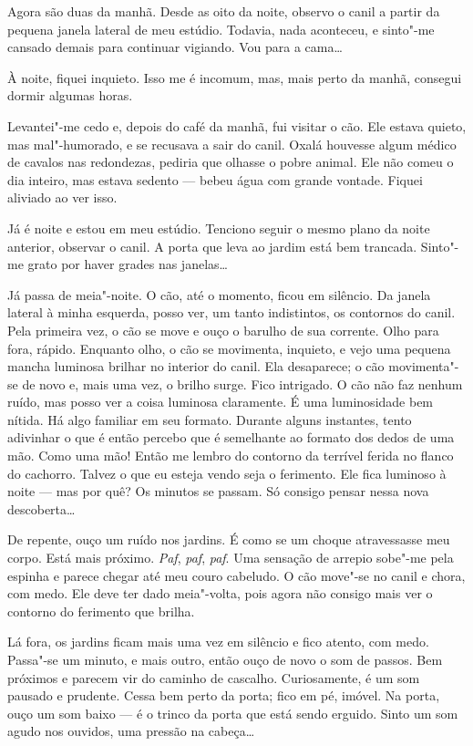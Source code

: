 Agora são duas da manhã. Desde as oito da noite, observo o canil a partir da pequena janela lateral de meu estúdio.
Todavia, nada aconteceu, e sinto"-me cansado demais para continuar vigiando. Vou para a cama\ldots{}

À noite, fiquei inquieto. Isso me é incomum, mas, mais perto da manhã, consegui dormir algumas horas.

Levantei"-me cedo e, depois do café da manhã, fui visitar o cão. Ele estava quieto, mas mal"-humorado, e se recusava a
sair do canil. Oxalá houvesse algum médico de cavalos nas redondezas, pediria que olhasse o pobre animal. Ele não comeu
o dia inteiro, mas estava sedento --- bebeu água com grande vontade. Fiquei aliviado ao ver isso.

Já é noite e estou em meu estúdio. Tenciono seguir o mesmo plano da noite anterior, observar o canil. A porta que leva
ao jardim está bem trancada. Sinto"-me grato por haver grades nas janelas\ldots{}

Já passa de meia"-noite. O cão, até o momento, ficou em silêncio. Da janela lateral à minha esquerda, posso
ver, um tanto indistintos, os contornos do canil. Pela primeira vez, o cão se move e ouço o barulho de sua corrente.
Olho para fora, rápido. Enquanto olho, o cão se movimenta, inquieto, e vejo uma pequena mancha luminosa brilhar no
interior do canil. Ela desaparece; o cão movimenta"-se de novo e, mais uma vez, o brilho surge. Fico intrigado. O cão
não faz nenhum ruído, mas posso ver a coisa luminosa claramente. É uma luminosidade bem nítida. Há algo familiar em seu
formato. Durante alguns instantes, tento adivinhar o que é então percebo que é semelhante ao formato dos dedos de
uma mão. Como uma mão! Então me lembro do contorno da terrível ferida no flanco do cachorro. Talvez o que eu esteja
vendo seja o ferimento. Ele fica luminoso à noite --- mas por quê? Os minutos se passam. Só consigo pensar nessa nova
descoberta\ldots{}

De repente, ouço um ruído nos jardins. É como se um choque atravessasse meu corpo. Está mais próximo. \textit{Paf},
\textit{paf}, \textit{paf}. Uma sensação de arrepio sobe"-me pela espinha e parece chegar até meu couro cabeludo. O cão
move"-se no canil e chora, com medo. Ele deve ter dado meia"-volta, pois agora não consigo mais ver o contorno do
ferimento que brilha.

Lá fora, os jardins ficam mais uma vez em silêncio e fico atento, com medo. Passa"-se um minuto, e mais outro, então
ouço de novo o som de passos. Bem próximos e parecem vir do caminho de cascalho. Curiosamente, é um som pausado e
prudente. Cessa bem perto da porta; fico em pé, imóvel. Na porta, ouço um som baixo --- é o trinco da porta que está
sendo erguido. Sinto um som agudo nos ouvidos, uma pressão na cabeça\ldots{}

